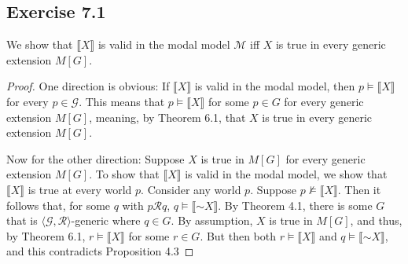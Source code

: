 \documentclass{article}
\newcommand*{\oldneg}{\mathord{\sim}}
\newcommand{\lbc}{\llbracket}
\newcommand{\rbc}{\rrbracket}
\theoremstyle{definition}
\begin{document}
\subsection*{Exercise 7.1}
We show that $\lbc X\rbc$ is valid in the modal model $\mathcal{M}$ iff $X$ is true in 
every generic extension $M[G]$.

\begin{proof}
One direction is obvious: If $\lbc X\rbc$ is valid in the modal model, then 
$p\vDash\lbc X\rbc$ for every $p\in\mathcal{G}$. This means that 
$p\vDash\lbc X\rbc$ for some $p\in G$ for every generic extension $M[G]$, meaning, 
by Theorem 6.1, that $X$ is true in every generic extension $M[G]$.

Now for the other direction: Suppose $X$ is true in $M[G]$ for every 
generic extension $M[G]$. To show that $\lbc X\rbc$ is valid in the modal model, we 
show that $\lbc X\rbc$ is true at every world $p$. Consider any world $p$. Suppose 
$p\nvDash\lbc X\rbc$. Then it follows that, for some $q$ with $p\mathcal{R}q$,
$q\vDash\lbc\oldneg X\rbc$. By Theorem 4.1, there is some $G$ that is 
$\langle\mathcal{G},\mathcal{R}\rangle$-generic where $q\in G$. By assumption, $X$ is true 
in $M[G]$, and thus, by Theorem 6.1, $r\vDash\lbc X\rbc$ for some $r\in G$. But then both 
$r\vDash\lbc X\rbc$ and $q\vDash\lbc\oldneg X\rbc$, and this contradicts Proposition 4.3 

\end{proof}
\end{document}
